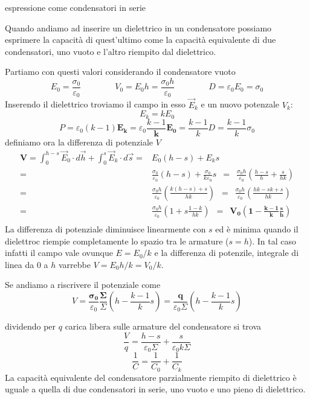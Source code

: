 \documentclass[x11names]{report}
\newcommand{\esempio}[2]{
	\begin{es}{#1}
		#2
	\end{es}
}
\begin{document}
\esempio{espressione come condensatori in serie}{
	Quando andiamo ad inserire un dielettrico in un condensatore possiamo esprimere la capacità di quest'ultimo come la capacità equivalente di due condensatori, uno vuoto e l'altro riempito dal dielettrico.
	
	Partiamo con questi valori considerando il condensatore vuoto
	\[
	E_0 = \frac{\sigma_0}{\varepsilon_0} \qquad \qquad V_0 = E_0 h = \frac{\sigma_0 h}{\varepsilon_0} \qquad \qquad D = \varepsilon_0 E_0 = \sigma_0
	\]
	Inserendo il dielettrico troviamo il campo in esso \(\vec{E}_k\) e un nuovo potenzale \(V_k\):
	\[
	E_k = kE_0
	\]
	\[
	P = \varepsilon_0(k-1)\boldsymbol{E_k} = \varepsilon_0 \frac{k-1}{\boldsymbol{k}}\boldsymbol{E_0} = \frac{k-1}{k}D = \frac{k-1}{k}\sigma_0
	\]
	definiamo ora la differenza di potenziale \(V\)
	\begin{align*}
		\boldsymbol{V= }\int_{0}^{h-s}\vec{E}_0\cdot d\vec{h} + \int_{0}^{s}\vec{E}_k\cdot d\vec{s} =& E_0(h-s) + E_ks \\
		=& \frac{\sigma_0}{\varepsilon_0}(h-s) + \frac{\sigma_0}{k\varepsilon_0}s \;\  = \;\ \frac{\sigma_0 h}{\varepsilon_0} \left(\frac{h-s}{h} + \frac{s}{hk}\right)\\
		=& \frac{\sigma_0 h}{\varepsilon_0} \left(\frac{k(h-s) + s}{hk} \right) \;\ = \;\ \frac{\sigma_0 h}{\varepsilon_0} \left(\frac{hk - sk +s}{hk} \right) \\
		=& \frac{\sigma_0 h}{\varepsilon_0} \left(1 + s\frac{1-k}{hk} \right) \;\ \boldsymbol{=} \;\ \boldsymbol{V_0\left(1 - \frac{k-1}{k}\frac{s}{h} \right)} \\
	\end{align*}
	La differenza di potenziale diminuisce linearmente con \(s\) ed è minima quando il dielettroc riempie completamente lo spazio tra le armature (\(s = h\)). In tal caso infatti il campo vale ovunque \(E = E_0/k\) e la differenza di potenzile, integrale di linea da \(0\) a \(h\) varrebbe \(V = E_0h/k = V_0/k\).
	
	Se andiamo a riscrivere il potenziale come
	\[
	V = \frac{\boldsymbol{\sigma_0}}{\varepsilon_0}\frac{\boldsymbol{\Sigma}}{\Sigma}\left(h - \frac{k-1}{k}s\right) = \frac{\boldsymbol{q}}{\varepsilon_0\Sigma}\left(h-\frac{k-1}{k}s\right)
	\]
	
	dividendo per \(q\) carica libera sulle armature del condensatore si trova
	\[
	\frac{V}{q} = \frac{h-s}{\varepsilon_0 \Sigma} + \frac{s}{\varepsilon_0 k \Sigma}
	\]
	\[
	\frac{1}{C} = \frac{1}{C_0} + \frac{1}{C_k}
	\]
	La capacità equivalente del condensatore parzialmente riempito di dielettrico è uguale a quella di due condensatori in serie, uno vuoto e uno pieno di dielettrico.}
\end{document}
